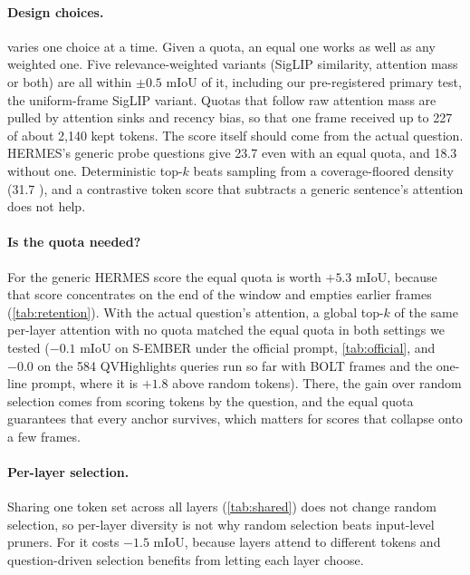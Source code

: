 \paragraph{Design choices.}
 varies one choice at a time. Given a quota, an equal one works as well as any weighted one. Five
relevance-weighted variants (SigLIP similarity, attention mass or both) are all within $\pm 0.5$ mIoU of it, including
our pre-registered primary test, the uniform-frame SigLIP variant. Quotas that follow raw attention mass are pulled by
attention sinks and recency bias, so that one frame received up to 227 of about 2{,}140 kept tokens. The score itself
should come from the actual question. HERMES's generic probe questions give 23.7 even with an equal quota, and 18.3 without one.
Deterministic top-$k$ beats sampling from a coverage-floored density (31.7 ), and a contrastive token score
that subtracts a generic sentence's attention does not help.

\paragraph{Is the quota needed?}
For the generic HERMES score the equal quota is worth $+5.3$ mIoU, because that score concentrates on the end of the
window and empties earlier frames (\cref{tab:retention}). With the actual question's attention, a global top-$k$ of
the same per-layer attention with no quota matched the equal quota in both settings we tested ($-0.1$ mIoU on S-EMBER
under the official prompt, \cref{tab:official}, and $-0.0$ on the 584 QVHighlights queries run so far with BOLT
frames and the one-line prompt, where it is $+1.8$ above random tokens).
There, the gain over random selection comes from scoring tokens by the question, and the equal quota guarantees that
every anchor survives, which matters for scores that collapse onto a few frames.

\paragraph{Per-layer selection.}
Sharing one token set across all layers (\cref{tab:shared}) does not change random selection, so per-layer diversity
is not why random selection beats input-level pruners. For \method it costs $-1.5$ mIoU, because layers attend to
different tokens and question-driven selection benefits from letting each layer choose.

